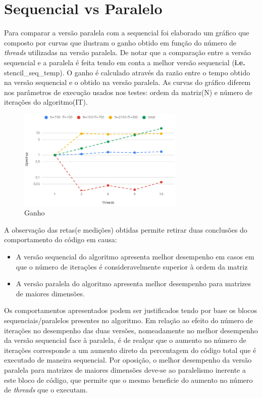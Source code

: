 \documentclass{article}
\begin{document}
\section{Sequencial vs Paralelo}
Para comparar a versão paralela com a sequencial foi elaborado um gráfico que
composto por curvas que ilustram o ganho obtido em função do número de \textit{threads} utilizadas na versão paralela.
De notar que a comparação entre a versão sequencial e a paralela é feita tendo em conta a melhor versão sequencial (\textbf{i.e.} stencil\_seq\_temp). 
O ganho é calculado através da razão entre o tempo obtido na versão sequencial e o obtido na versão paralela.
As curvas do gráfico diferem nos parâmetros de execução usados nos testes: ordem da matriz(N) e número de iterações do algoritmo(IT).

\begin{figure}[H]
    \centering
    \includegraphics[width=300px]{speedup.png}
    \caption{Ganho}
\end{figure}

A observação das retas(e medições) obtidas permite retirar duas conclusões do comportamento do código em causa:
\begin{itemize}
    \item A versão sequencial do algoritmo apresenta melhor desempenho em casos em que o número de iterações é consideravelmente superior à ordem da matriz
    \item A versão paralela do algoritmo apresenta melhor desempenho para matrizes de maiores dimensões.
\end{itemize}
Os comportamentos apresentados podem ser justificados tendo por base os blocos sequenciais/paralelos presentes no algoritmo.
Em relação ao efeito do número de iterações no desempenho das duas versões, nomeadamente no melhor desempenho da versão sequencial face à paralela, é de realçar que o aumento no número de iterações corresponde a um aumento direto da percentagem do código total que é executado de maneira sequencial.
Por oposição, o melhor desempenho da versão paralela para matrizes de maiores dimensões deve-se ao paralelismo inerente a este bloco de código, que permite que o mesmo beneficie do aumento no número de \textit{threads} que o executam.
\end{document}
